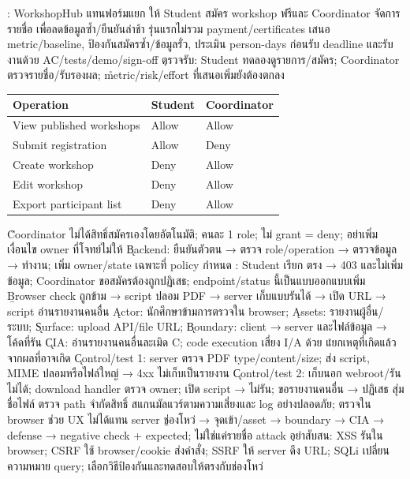 \extra {}: WorkshopHub แทนฟอร์มแยก ให้ Student สมัคร workshop ฟรีและ Coordinator จัดการรายชื่อ เพื่อลดข้อมูลซ้ำ/ยืนยันล่าช้า รุ่นแรกไม่รวม payment/certificates เสนอ metric/baseline, ป้องกันสมัครซ้ำ/ข้อมูลรั่ว, ประเมิน person-days ก่อนรับ deadline และรับงานด้วย AC/tests/demo/sign-off
\k{ตรวจรับ}: Student ทดลองดูรายการ/สมัคร; Coordinator ตรวจรายชื่อ/รับรองผล; \r{metric/risk/effort ที่เสนอเพิ่มยังต้องตกลง}
{\smalltable\begin{tabularx}{\linewidth}{|Y|C{7mm}|C{9mm}|}\hline
{}Operation & Student & Coordinator\\\hline
View published workshops & Allow & Allow\\\hline
Submit registration & Allow & Deny\\\hline
Create workshop & Deny & Allow\\\hline
Edit workshop & Deny & Allow\\\hline
Export participant list & Deny & Allow\\\hline
\end{tabularx}}
\r{Coordinator ไม่ได้สิทธิ์สมัครเองโดยอัตโนมัติ}; คนละ 1 role; ไม่ grant = deny; อย่าเพิ่มเงื่อนไข owner ที่โจทย์ไม่ให้
\k{Backend}: ยืนยันตัวตน → ตรวจ role/operation → ตรวจข้อมูล → ทำงาน; เพิ่ม owner/state เฉพาะที่ policy กำหนด
\extra {}: Student เรียก  ตรง → 403 และไม่เพิ่มข้อมูล; Coordinator ขอสมัครต้องถูกปฏิเสธ; endpoint/status นี้เป็นแบบออกแบบเพิ่ม
\b{Browser check ถูกข้าม → script ปลอม PDF → server เก็บแบบรันได้ → เปิด URL → script อ่านรายงานคนอื่น}
\k{Actor}: นักศึกษาข้ามการตรวจใน browser; \k{Assets}: รายงานผู้อื่น/ระบบ; \k{Surface}: upload API/file URL; \k{Boundary}: client → server และไฟล์ข้อมูล → โค้ดที่รัน
\k{CIA}: อ่านรายงานคนอื่นละเมิด C; code execution เสี่ยง I/A ด้วย \r{แยกเหตุที่เกิดแล้วจากผลที่อาจเกิด}
\k{Control/test 1}: server ตรวจ PDF type/content/size; ส่ง script, MIME ปลอมหรือไฟล์ใหญ่ → 4xx ไม่เก็บเป็นรายงาน
\k{Control/test 2}: เก็บนอก webroot/รันไม่ได้; download handler ตรวจ owner; เปิด script → ไม่รัน; ขอรายงานคนอื่น → ปฏิเสธ
\extra สุ่มชื่อไฟล์ ตรวจ path จำกัดสิทธิ์ สแกนมัลแวร์ตามความเสี่ยงและ log อย่างปลอดภัย; ตรวจใน browser ช่วย UX ไม่ได้แทน server
\b{ช่องโหว่ → จุดเข้า/asset → boundary → CIA → defense → negative check + expected}; ไม่ใช่แค่รายชื่อ attack
\k{อย่าสับสน}: XSS รันใน browser; CSRF ใช้ browser/cookie ส่งคำสั่ง; SSRF ให้ server ดึง URL; SQLi เปลี่ยนความหมาย query; เลือกวิธีป้องกันและทดสอบให้ตรงกับช่องโหว่
